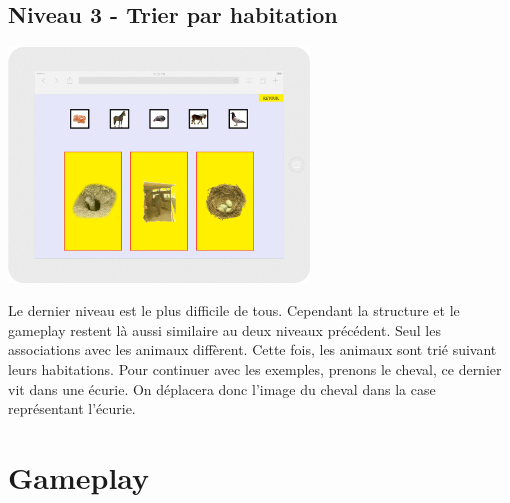\documentclass{article}
\begin{document}
\subsection{Niveau 3 - Trier par habitation}
\vspace{0.5cm}
\begin{center}
\includegraphics[width=0.6\textwidth]{page4}
\end{center}
\vspace{0.5cm}
\hspace*{0.6cm}Le dernier niveau est le plus difficile de tous. Cependant la structure et le gameplay restent l\`a aussi similaire au deux niveaux pr\'ec\'edent. Seul les associations avec les animaux diff\`erent. Cette fois, les animaux sont tri\'e suivant leurs habitations. Pour continuer avec les exemples, prenons le cheval, ce dernier vit dans une \'ecurie. On d\'eplacera donc l'image du cheval dans la case repr\'esentant l'\'ecurie.
    
\section{Gameplay}
\end{document}
